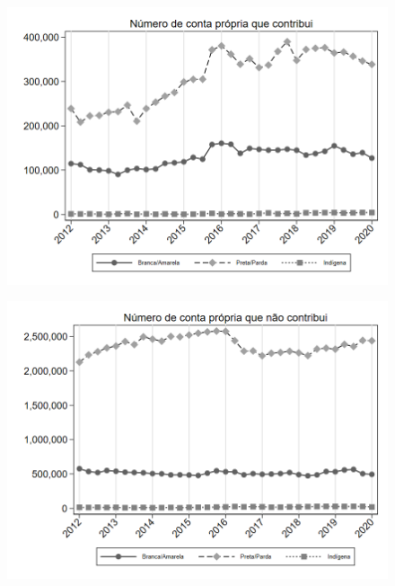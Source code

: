 \begin{frame}[label=_composicao_demografica_raca_n_cpropriaC]{}
\textit{\hyperlink{_composicao_demografica_raca}{}}
\begin{figure}
  \centering
  \includegraphics[width=1.0\linewidth]{../../analysis/output/composicao_demografica/raca/_composicao_demografica_raca_n_cpropriaC.png}
  \caption{}
  \label{fig:_composicao_demografica_raca_n_cpropriaC}
\end{figure}
\end{frame}

\begin{frame}[label=_composicao_demografica_raca_n_cpropriaNc]{}
\textit{\hyperlink{_composicao_demografica_raca}{}}
\begin{figure}
  \centering
  \includegraphics[width=1.0\linewidth]{../../analysis/output/composicao_demografica/raca/_composicao_demografica_raca_n_cpropriaNc.png}
  \caption{}
  \label{fig:_composicao_demografica_raca_n_cpropriaNc}
\end{figure}
\end{frame}